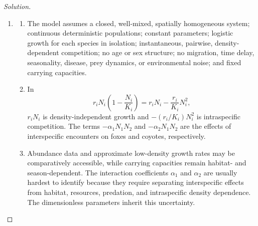 \documentclass[12pt]{amsart}
\theoremstyle{conjecture}
\theoremstyle{definition}
\theoremstyle{question}
\theoremstyle{theorem}
\newenvironment{solution}
{\begin{proof}[Solution]}
{\end{proof}}
\begin{document}
\begin{enumerate}[leftmargin=2em]
\begin{solution}
\begin{enumerate}[label=(\alph*),leftmargin=2.2em]
\begin{enumerate}[label=\roman*.,leftmargin=2em]
            \item At the interior equilibrium, the nullcline identities reduce
            the Jacobian to
            \[
                J(e_4)=\begin{bmatrix}
                           -x_*&-\beta_1x_*\\
                           -\beta_2y_*&-\rho y_*
                \end{bmatrix}.
            \]
            Therefore
            \[
                \operatorname{tr}J(e_4)=-(x_*+\rho y_*)<0,
                \qquad
                \det J(e_4)=x_*y_*(\rho-\beta_1\beta_2).
            \]
            If $\beta_1<1$ and $\beta_2<\rho$, the determinant is positive,
            so $e_4$ is asymptotically stable.  If $\beta_1>1$ and
            $\beta_2>\rho$, the determinant is negative, so $e_4$ is a saddle;
            its stable manifold separates initial conditions leading to fox
            exclusion from those leading to coyote exclusion.
          \end{enumerate}

          \item
          \begin{enumerate}[label=\roman*.,leftmargin=2em]
            \item The model assumes a closed, well-mixed, spatially homogeneous
            system; continuous deterministic populations; constant parameters;
            logistic growth for each species in isolation; instantaneous,
            pairwise, density-dependent competition; no age or sex structure;
            no migration, time delay, seasonality, disease, prey dynamics, or
            environmental noise; and fixed carrying capacities.

            \item In
            \[
                r_iN_i\left(1-\frac{N_i}{K_i}\right)
                =r_iN_i-\frac{r_i}{K_i}N_i^2,
            \]
            $r_iN_i$ is density-independent growth and
            $-(r_i/K_i)N_i^2$ is intraspecific competition.  The terms
            $-\alpha_1N_1N_2$ and $-\alpha_2N_1N_2$ are the effects of
            interspecific encounters on foxes and coyotes, respectively.

            \item Abundance data and approximate low-density growth rates may be
            comparatively accessible, while carrying capacities remain
            habitat- and season-dependent.  The interaction coefficients
            $\alpha_1$ and $\alpha_2$ are usually hardest to identify because
            they require separating interspecific effects from habitat,
            resources, predation, and intraspecific density dependence.  The
            dimensionless parameters inherit this uncertainty.
          \end{enumerate}


\end{enumerate}
\end{solution}
\end{enumerate}
\end{document}
